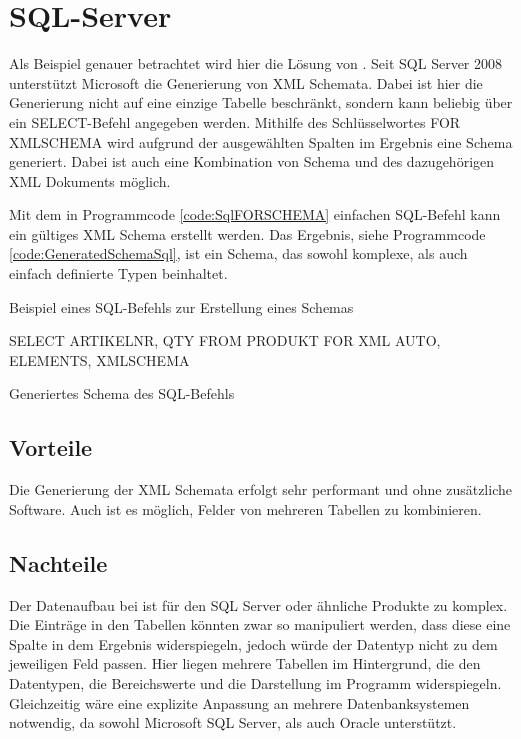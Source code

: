 \section{SQL-Server}
Als Beispiel genauer betrachtet wird hier die Lösung von \textcite{SqlServer}. Seit SQL Server 2008 unterstützt Microsoft die Generierung von XML Schemata. Dabei ist hier die Generierung nicht auf eine einzige Tabelle beschränkt, sondern kann beliebig über ein SELECT-Befehl angegeben werden. 
Mithilfe des Schlüsselwortes FOR XMLSCHEMA wird aufgrund der ausgewählten Spalten im Ergebnis eine Schema generiert.
Dabei ist auch eine Kombination von Schema und des dazugehörigen XML Dokuments möglich.

Mit dem in Programmcode \ref{code:SqlFORSCHEMA} einfachen SQL-Befehl kann ein gültiges XML Schema erstellt werden. Das Ergebnis, siehe Programmcode \ref{code:GeneratedSchemaSql}, ist ein Schema, das sowohl komplexe, als auch einfach definierte Typen beinhaltet.

\begin{program}
\caption{Beispiel eines SQL-Befehls zur Erstellung eines Schemas}
\label{code:SqlFORSCHEMA}
\begin{GenericCode}
    SELECT ARTIKELNR, QTY
    FROM PRODUKT
    FOR XML AUTO, ELEMENTS, XMLSCHEMA
\end{GenericCode}
\end{program}

\begin{program}
\caption{Generiertes Schema des SQL-Befehls}
\label{code:GeneratedSchemaSql}
    
\end{program}

\subsection{Vorteile}
Die Generierung der XML Schemata erfolgt sehr performant und ohne zusätzliche Software.
Auch ist es möglich, Felder von mehreren Tabellen zu kombinieren.

\subsection{Nachteile}
Der Datenaufbau bei \BMD ist für den SQL Server oder ähnliche Produkte zu komplex.
Die Einträge in den Tabellen könnten zwar so manipuliert werden, dass diese eine Spalte in dem Ergebnis widerspiegeln, jedoch würde der Datentyp nicht zu dem jeweiligen Feld passen. Hier liegen mehrere Tabellen im Hintergrund, die den Datentypen, die Bereichswerte und die Darstellung im Programm widerspiegeln. 
Gleichzeitig wäre eine explizite Anpassung an mehrere Datenbanksystemen notwendig, da \BMD sowohl Microsoft SQL Server, als auch Oracle unterstützt.

